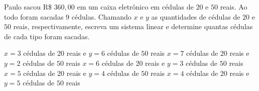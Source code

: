 Paulo sacou R\$ $360{,}00$ em um caixa eletrônico em cédulas de $20$ e $50$ reais. Ao todo foram sacadas $9$ cédulas. Chamando $x$ e $y$ as quantidades de cédulas de $20$ e $50$ reais, respectivamente, escreva um sistema linear e determine quantas cédulas de cada tipo foram sacadas.

$x=3$ cédulas de $20$ reais e $y=6$ cédulas de $50$ reais
$x=7$ cédulas de $20$ reais e $y=2$ cédulas de $50$ reais
$x=6$ cédulas de $20$ reais e $y=3$ cédulas de $50$ reais
$x=5$ cédulas de $20$ reais e $y=4$ cédulas de $50$ reais
$x=4$ cédulas de $20$ reais e $y=5$ cédulas de $50$ reais


